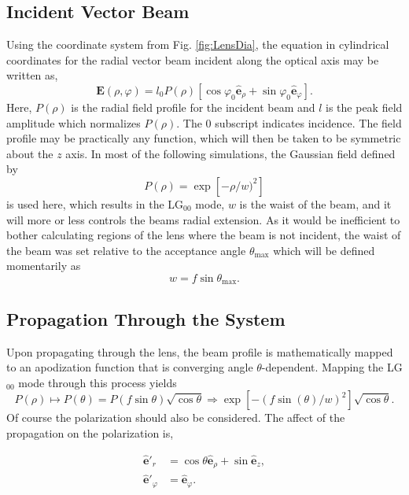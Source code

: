 \documentclass[12pt,a4paper]{article}
\begin{document}
\subsection{Incident Vector Beam}
Using the coordinate system from Fig. \ref{fig:LensDia}, the equation in cylindrical coordinates for the radial vector beam incident along the optical axis may be written as,
\begin{equation}\label{start}
\textbf{E}(\rho, \varphi) = l_0P(\rho)[\cos\varphi_0 \hat{\textbf{e}}_\rho+\sin\varphi_0\hat{\textbf{e}}_\varphi].
\end{equation}
Here, $P(\rho)$ is the radial field profile for the incident beam and $l$ is the peak field amplitude which normalizes $P(\rho)$. The 0 subscript indicates incidence. The field profile may be practically any function, which will then be taken to be symmetric about the $z$ axis. In most of the following simulations, the Gaussian field defined by 
\begin{equation}
P(\rho) = \exp[-\rho/w)^2]
\end{equation}
is used here, which results in the LG$_{00}$ mode, $w$ is the waist of the beam, and it will more or less controls the beams radial extension. As it would be inefficient to bother calculating regions of the lens where the beam is not incident, the waist of the beam was set relative to the acceptance angle $\theta_\text{max}$ which will be defined momentarily as
\begin{equation}
\label{eqn:beamwaist}
w = f\sin\theta_\text{max}.
\end{equation}

\subsection{Propagation Through the System}
Upon propagating through the lens, the beam profile is mathematically mapped to an apodization function that is converging angle $\theta$-dependent. Mapping the LG$_{00}$ mode through this process yields
\begin{equation}\label{eqn:Ptheta}
P(\rho)\mapsto P(\theta) = P(f\sin\theta)\sqrt{\cos\theta} \Rightarrow \exp[-(f\sin(\theta)/w)^2]\sqrt{\cos\theta}.
\end{equation}
Of course the polarization should also be considered. The affect of the propagation on the polarization is,

\begin{equation}	\label{eqn:Pol}
	\begin{aligned}
	\hat{\textbf{e}}'_r & = \cos\theta \hat{\textbf{e}}_\rho + \sin \hat{\textbf{e}}_z, \\
	\hat{\textbf{e}}'_\varphi & = \hat{\textbf{e}}_\varphi. 
	\end{aligned}		
\end{equation}
\end{document}
